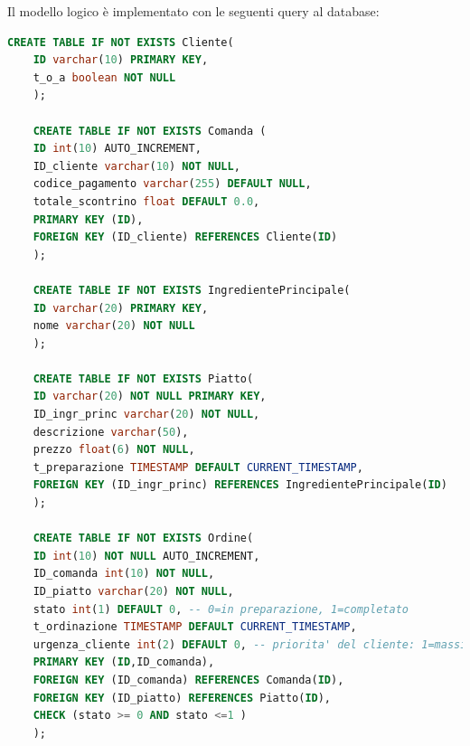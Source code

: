 \newpage
Il modello logico è implementato con le seguenti query al database:

\begin{lstlisting}[language=SQL,caption=Query del database in SQL,label=lst:sqlcode]
	CREATE TABLE IF NOT EXISTS Cliente(
	ID varchar(10) PRIMARY KEY,
	t_o_a boolean NOT NULL
	);
	
	CREATE TABLE IF NOT EXISTS Comanda (
	ID int(10) AUTO_INCREMENT,
	ID_cliente varchar(10) NOT NULL,
	codice_pagamento varchar(255) DEFAULT NULL,
	totale_scontrino float DEFAULT 0.0,
	PRIMARY KEY (ID),
	FOREIGN KEY (ID_cliente) REFERENCES Cliente(ID)
	);
	
	CREATE TABLE IF NOT EXISTS IngredientePrincipale(
	ID varchar(20) PRIMARY KEY,
	nome varchar(20) NOT NULL
	);
	
	CREATE TABLE IF NOT EXISTS Piatto(
	ID varchar(20) NOT NULL PRIMARY KEY,
	ID_ingr_princ varchar(20) NOT NULL,
	descrizione varchar(50),
	prezzo float(6) NOT NULL,
	t_preparazione TIMESTAMP DEFAULT CURRENT_TIMESTAMP,
	FOREIGN KEY (ID_ingr_princ) REFERENCES IngredientePrincipale(ID)
	);
	
	CREATE TABLE IF NOT EXISTS Ordine(
	ID int(10) NOT NULL AUTO_INCREMENT,
	ID_comanda int(10) NOT NULL,
	ID_piatto varchar(20) NOT NULL,
	stato int(1) DEFAULT 0, -- 0=in preparazione, 1=completato
	t_ordinazione TIMESTAMP DEFAULT CURRENT_TIMESTAMP,
	urgenza_cliente int(2) DEFAULT 0, -- priorita' del cliente: 1=massima, -1=minima
	PRIMARY KEY (ID,ID_comanda),
	FOREIGN KEY (ID_comanda) REFERENCES Comanda(ID),
	FOREIGN KEY (ID_piatto) REFERENCES Piatto(ID),
	CHECK (stato >= 0 AND stato <=1 )
	);
\end{lstlisting}

\clearpage